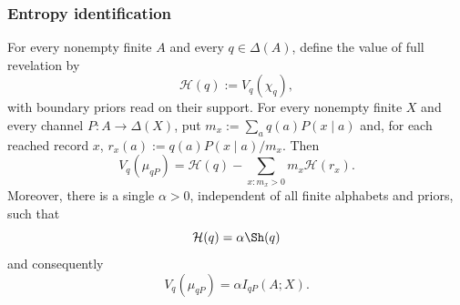 \subsubsection{Entropy identification}

\begin{lemma}
\label{pt:lem:faddeevsketch}
For every nonempty finite $A$ and every $q\in\Delta(A)$, define the value of
full revelation by
\[
 \mathcal H(q):=V_q(\chi_q),
\]
with boundary priors read on their support.
For every nonempty finite $X$ and every channel $P:A\to\Delta(X)$, put
$m_x:=\sum_aq(a)P(x\mid a)$ and, for each reached record $x$,
$r_x(a):=q(a)P(x\mid a)/m_x$.  Then
\begin{equation}
 V_q(\mu_{qP})
 =\mathcal H(q)-\sum_{x:m_x>0}m_x\mathcal H(r_x).
\tag{ER}\label{pt:eq:entropy-reduction}
\end{equation}
Moreover, there is a single $\alpha>0$, independent of all finite alphabets
and priors, such that
\[
 \mathcal H(q)=\alpha\Sh(q)
\]
and consequently
\[
 V_q(\mu_{qP})=\alpha I_{qP}(A;X).
\tag{MI}\label{pt:eq:value-MI}
\]
\end{lemma}

